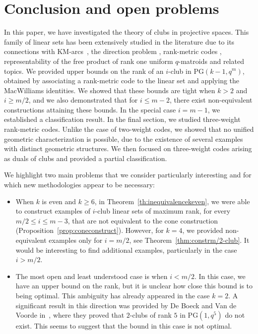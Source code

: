 \documentclass[11pt]{amsart}
\theoremstyle{definition}
\newcommand{\PG}{\mathrm{PG}}
\begin{document}
\section{Conclusion and open problems}

In this paper, we have investigated the theory of clubs in projective spaces. This family of linear sets has been extensively studied in the literature due to its connections with KM-arcs~\cite{de2016linear}, the direction problem \cite{napolitano2022clubs}, rank-metric codes \cite{sheekeyVdV,napolitano2022clubs}, representability of the free product of rank one uniform $q$-matroids \cite{alfarano2024free} and related topics.  
We provided upper bounds on the rank of an \( i \)-club in \(\PG(k-1, q^m)\), obtained by associating a rank-metric code to the linear set and applying the MacWilliams identities.  
We showed that these bounds are tight when \(k > 2\) and \(i \geq m/2\), and we also demonstrated that for \(i \leq m - 2\), there exist non-equivalent constructions attaining these bounds. In the special case \(i = m - 1\), we established a classification result.  
In the final section, we studied three-weight rank-metric codes. Unlike the case of two-weight codes, we showed that no unified geometric characterization is possible, due to the existence of several examples with distinct geometric structures. We then focused on three-weight codes arising as duals of clubs and provided a partial classification.

We highlight two main problems that we consider particularly interesting and for which new methodologies appear to be necessary:

\begin{itemize}
    \item 
  When \(k\) is even and \(k \geq 6\), in Theorem~\ref{th:inequivalencekeven}, we were able to construct examples of \(i\)-club linear sets of maximum rank, for every \(m/2 \leq i \leq m - 3\), that are not equivalent to the cone construction (Proposition~\ref{prop:coneconstruct}). However, for \(k = 4\), we provided non-equivalent examples only for \(i = m/2\), see Theorem~\ref{thm:constrm/2-club}. It would be interesting to find additional examples, particularly in the case \(i > m/2\).
    \item The most open and least understood case is when \(i < m/2\). In this case, we have an upper bound on the rank, but it is unclear how close this bound is to being optimal. This ambiguity has already appeared in the case \(k = 2\). A significant result in this direction was provided by De Boeck and Van de Voorde in~\cite{de2022weight}, where they proved that \(2\)-clubs of rank \(5\) in \(\PG(1, q^5)\) do not exist. This seems to suggest that the bound in this case is not optimal.
\end{itemize}
\end{document}

